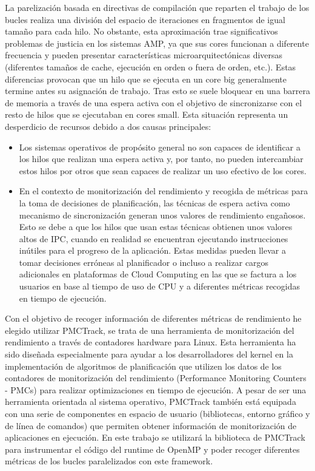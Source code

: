 La parelización basada en directivas de compilación que reparten el trabajo de los bucles realiza una división del espacio de iteraciones en fragmentos de igual tamaño para cada hilo. No obstante, esta aproximación trae significativos problemas de justicia en los sistemas AMP, ya que sus cores funcionan a diferente frecuencia y pueden presentar características microarquitectónicas diversas (diferentes tamaños de cache, ejecución en orden o fuera de orden, etc.). Estas diferencias provocan que un hilo que se ejecuta en un core big generalmente termine antes su asignación de trabajo. Tras esto se suele bloquear en una barrera de memoria a través de una espera activa con el objetivo de sincronizarse con el resto de hilos que se ejecutaban en cores small. Esta situación representa un desperdicio de recursos debido a dos causas principales:

\begin{itemize}
	\item Los sistemas operativos de propósito general no son capaces de identificar a los hilos que realizan una espera activa y, por tanto, no pueden intercambiar estos hilos por otros que sean capaces de realizar un uso efectivo de los cores.
	\item En el contexto de monitorización del rendimiento y recogida de métricas para la toma de decisiones de planificación, las técnicas de espera activa como mecanismo de sincronización generan unos valores de rendimiento engañosos. Esto se debe a que los hilos que usan estas técnicas obtienen unos valores altos de IPC, cuando en realidad se encuentran ejecutando instrucciones inútiles para el progreso de la aplicación. Estas medidas pueden llevar a tomar decisiones erróneas al planificador o incluso a realizar cargos adicionales en plataformas de Cloud Computing en las que se factura a los usuarios en base al tiempo de uso de CPU y a diferentes métricas recogidas en tiempo de ejecución.
\end{itemize}


Con el objetivo de recoger información de diferentes métricas de rendimiento he elegido utilizar PMCTrack, se trata de una herramienta de monitorización del rendimiento a través de contadores hardware para Linux. Esta herramienta ha sido diseñada especialmente para ayudar a los desarrolladores del kernel en la implementación de algoritmos de planificación que utilizen los datos de los contadores de monitorización del rendimiento (Performance Monitoring Counters - PMCs) para realizar optimizaciones en tiempo de ejecución. A pesar de ser una herramienta orientada al sistema operativo, PMCTrack también está equipada con una serie de componentes en espacio de usuario (bibliotecas, entorno gráfico y de línea de comandos) que permiten obtener información de monitorización de aplicaciones en ejecución. En este trabajo se utilizará la biblioteca de PMCTrack para instrumentar el código del runtime de OpenMP y poder recoger diferentes métricas de los bucles paralelizados con este framework.

